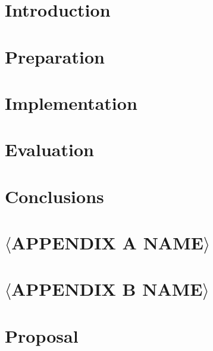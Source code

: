 \documentclass[12pt,a4paper,twoside,openright]{report}
\begin{document}
\chapter{Introduction}


\chapter{Preparation}


\chapter{Implementation}


\chapter{Evaluation}


\chapter{Conclusions}



\newpage

\printbibliography


\appendix


\chapter{\(\langle\)APPENDIX A NAME\(\rangle\)}



\newpage

\chapter{\(\langle\)APPENDIX B NAME\(\rangle\)}



\newpage

\chapter{Proposal}



\end{document}
